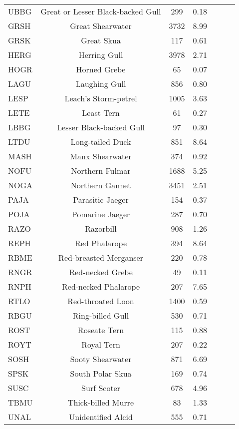 \documentclass{statsoc}
\begin{document}
{\begin{longtable}{| l | c | c | c | c | c | c | }
UBBG &  Great or Lesser Black-backed Gull & 299 & 0.18 &  &   &  \\ 
GRSH &  Great Shearwater & 3732 & 8.99 &  &  &   \\ 
GRSK &  Great Skua & 117 & 0.61 &  &  & \\ 
HERG &  Herring Gull & 3978 & 2.71 &  &  &  \\ 
HOGR &  Horned Grebe & 65 & 0.07 &  &  &  \\ 
LAGU &  Laughing Gull & 856  & 0.80 &  &   &  \\ 
LESP &  Leach's Storm-petrel & 1005 & 3.63 &  &  &  \\ 
LETE &  Least Tern & 61 & 0.27 &  &  &  \\ 
LBBG &  Lesser Black-backed Gull & 97 & 0.30 &  &  &  \\ 
LTDU &  Long-tailed Duck & 851 & 8.64 &  &  &    \\ 
MASH &  Manx Shearwater & 374 & 0.92 &  &  &    \\ 
NOFU &  Northern Fulmar & 1688 & 5.25 &  &  &   \\ 
NOGA &  Northern Gannet & 3451 & 2.51 &  &  &   \\ 
PAJA &  Parasitic Jaeger & 154 & 0.37 &  &  &   \\ 
POJA &  Pomarine Jaeger & 287 & 0.70 &  &  &   \\ 
RAZO &  Razorbill & 908 & 1.26 &  &  &   \\ 
REPH &  Red Phalarope & 394 & 8.64 &  &  &  \\ 
RBME &  Red-breasted Merganser & 220 & 0.78 &  &  &  \\ 
RNGR &  Red-necked Grebe & 49 & 0.11 &  &  &    \\ 
RNPH &  Red-necked Phalarope & 207 & 7.65 &  &  &    \\ 
RTLO &  Red-throated Loon & 1400 & 0.59 &  &  &   \\ 
RBGU &  Ring-billed Gull & 530 & 0.71 &  &  &   \\ 
ROST &  Roseate Tern & 115 & 0.88 &  &  &    \\ 
ROYT &  Royal Tern & 207 & 0.22 &  &  &    \\ 
SOSH &  Sooty Shearwater & 871 & 6.69 &  &  &   \\ 
SPSK &  South Polar Skua & 169 & 0.74  &  &  &  \\ 
SUSC &  Surf Scoter & 678 & 4.96 &  &  &   \\ 
TBMU &  Thick-billed Murre & 83 & 1.33 & &  &  \\ 
UNAL &  Unidentified Alcid & 555 & 0.71 &  &  &  \\ 

\end{longtable}}
\end{document}
